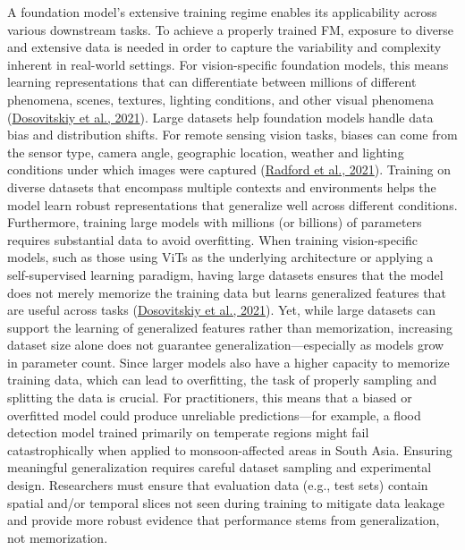 \documentclass[
  letterpaper,
  DIV=11,
  numbers=noendperiod]{scrreprt}
\begin{document}
A foundation model's extensive training regime enables its applicability
across various downstream tasks. To achieve a properly trained FM,
exposure to diverse and extensive data is needed in order to capture the
variability and complexity inherent in real-world settings. For
vision-specific foundation models, this means learning representations
that can differentiate between millions of different phenomena, scenes,
textures, lighting conditions, and other visual phenomena
(\href{https://doi.org/10.48550/arXiv.2010.11929}{Dosovitskiy et al.,
2021}). Large datasets help foundation models handle data bias and
distribution shifts. For remote sensing vision tasks, biases can come
from the sensor type, camera angle, geographic location, weather and
lighting conditions under which images were captured
(\href{https://doi.org/10.48550/arXiv.2103.00020}{Radford et al.,
2021}). Training on diverse datasets that encompass multiple contexts
and environments helps the model learn robust representations that
generalize well across different conditions. Furthermore, training large
models with millions (or billions) of parameters requires substantial
data to avoid overfitting. When training vision-specific models, such as
those using ViTs as the underlying architecture or applying a
self-supervised learning paradigm, having large datasets ensures that
the model does not merely memorize the training data but learns
generalized features that are useful across tasks
(\href{https://doi.org/10.48550/arXiv.2010.11929}{Dosovitskiy et al.,
2021}). Yet, while large datasets can support the learning of
generalized features rather than memorization, increasing dataset size
alone does not guarantee generalization---especially as models grow in
parameter count. Since larger models also have a higher capacity to
memorize training data, which can lead to overfitting, the task of
properly sampling and splitting the data is crucial. For practitioners,
this means that a biased or overfitted model could produce unreliable
predictions---for example, a flood detection model trained primarily on
temperate regions might fail catastrophically when applied to
monsoon-affected areas in South Asia. Ensuring meaningful generalization
requires careful dataset sampling and experimental design. Researchers
must ensure that evaluation data (e.g., test sets) contain spatial
and/or temporal slices not seen during training to mitigate data leakage
and provide more robust evidence that performance stems from
generalization, not memorization.
\end{document}
